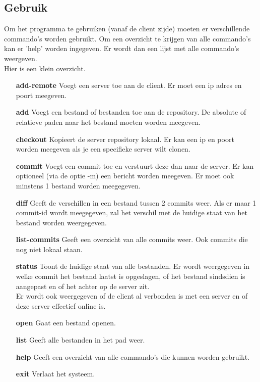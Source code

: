 \documentclass{article}
\begin{document}
\subsection{Gebruik}
\label{sub:gebruik}
Om het programma te gebruiken (vanaf de client zijde) moeten er verschillende commando's worden gebruikt. Om een overzicht te krijgen van alle commando's kan er 'help' worden ingegeven. Er wordt dan een lijst met alle commando's weergeven.\\
Hier is een klein overzicht.
\begin{itemize}
\item[\textbf{add-remote}] Voegt een server toe aan de client. Er moet een ip adres en poort meegeven.
\item[\textbf{add}] Voegt een bestand of bestanden toe aan de repository. De absolute of relatieve paden naar het bestand moeten worden meegeven.
\item[\textbf{checkout}] Kopieert de server repository lokaal. Er kan een ip en poort worden meegeven als je een specifieke server wilt clonen.
\item[\textbf{commit}] Voegt een commit toe en verstuurt deze dan naar de server. Er kan optioneel (via de optie -m) een bericht worden meegeven. Er moet ook minstens 1 bestand worden meegegeven.
\item[\textbf{diff}] Geeft de verschillen in een bestand tussen 2 commits weer. Als er maar 1 commit-id wordt meegegeven, zal het verschil met de huidige staat van het bestand worden weergegeven.
\item[\textbf{list-commits}] Geeft een overzicht van alle commits weer. Ook commits die nog niet lokaal staan.
\item[\textbf{status}] Toont de huidige staat van alle bestanden. Er wordt weergegeven in welke commit het bestand laatst is opgeslagen, of het bestand sindsdien is aangepast en of het achter op de server zit.\\
Er wordt ook weergegeven of de client al verbonden is met een server en of deze server effectief online is.
\item[\textbf{open}] Gaat een bestand openen.
\item[\textbf{list}] Geeft alle bestanden in het pad weer.
\item[\textbf{help}] Geeft een overzicht van alle commando's die kunnen worden gebruikt.
\item[\textbf{exit}] Verlaat het systeem.
\end{itemize}

\end{document}
